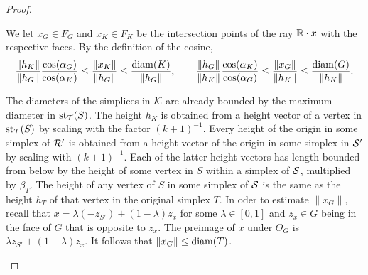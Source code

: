 \documentclass[10pt,letterpaper]{article}
\begin{document}
\begin{proof}
\begin{itemize}
        We let $x_{G} \in F_{G}$ and $x_{K} \in F_{K}$ be the intersection points of the ray ${\mathbb R} \cdot x$ with the respective faces.
        By the definition of the cosine, 
        \begin{align*}
            \frac{ \| h_K \| }{ \| h_{{G}} \| }
            \frac{ \cos(\alpha_{{G}}) }{ \cos(\alpha_K) }
            \leq 
            \frac{ \| x_K \| }{ \| h_{{G}} \| }
            \leq 
            \frac{ {\operatorname{diam}}(K) }{ \| h_{{G}} \| }
            ,
            \qquad 
            \frac{ \| h_{{G}} \| }{ \| h_K \| }
            \frac{ \cos(\alpha_K) }{ \cos(\alpha_{{G}}) }
            \leq 
            \frac{ \| x_{G} \| }{ \| h_{K} \| }
            \leq 
            \frac{ {\operatorname{diam}}(G) }{ \| h_{K} \| }
            .
        \end{align*}

        The diameters of the simplices in ${\mathcal K}$ are already bounded by the maximum diameter in $\operatorname{st}_{{\mathcal T}}(S)$.
        The height $h_{K}$ is obtained from a height vector of a vertex in $\operatorname{st}_{{\mathcal T}}(S)$ by scaling with the factor $(k+1)^{-1}$.
        Every height of the origin in some simplex of ${\mathcal R}'$ is obtained from a height vector of the origin in some simplex in ${\mathcal S}'$
        by scaling with $(k+1)^{-1}$. Each of the latter height vectors has length bounded from below by the height of some vertex in $S$ within a simplex of ${\mathcal S}$, multiplied by $\beta_T$. The height of any vertex of $S$ in some simplex of ${\mathcal S}$ is the same as the height $h_T$ of that vertex in the original simplex $T$. 
        In oder to estimate $\|x_{G}\|$, recall that $x = \lambda (-z_{S'}) + (1-\lambda) z_{x}$ for some $\lambda \in [0,1]$ and $z_{x} \in G$
        being in the face of $G$ that is opposite to $z_{x}$. The preimage of $x$ under $\Theta_{{G}}$ is $\lambda z_{S'} + (1-\lambda) z_{x}$. 
        It follows that $\|x_{G}\| \leq {\operatorname{diam}}(T)$. 
        

\end{itemize}
\end{proof}
\end{document}
